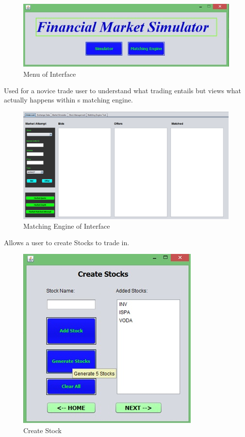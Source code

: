 \documentclass[12pt]{article}
\begin{document}
            \begin{figure}[th]
             \centering
             \includegraphics[scale=0.8]{maininterface}
             \caption{Menu of Interface}
             \label{Main Interface}
            \end{figure}
            
            Used for a novice trade user to understand what trading entails but views what actually happens within s matching engine.
          
            \begin{figure}[th]
            \centering
            \includegraphics[scale=0.8]{matchingengine}
            \caption{Matching Engine of Interface}
            \label{Matching Engine}
            \end{figure}
            
             Allows a user to create Stocks to trade in.

        \pagebreak
		\begin{figure}[h!]
		\centering
		\includegraphics[scale=0.8]{createstock}
		\caption{Create Stock}
		\label{Create Stock}
		\end{figure}
\end{document}
